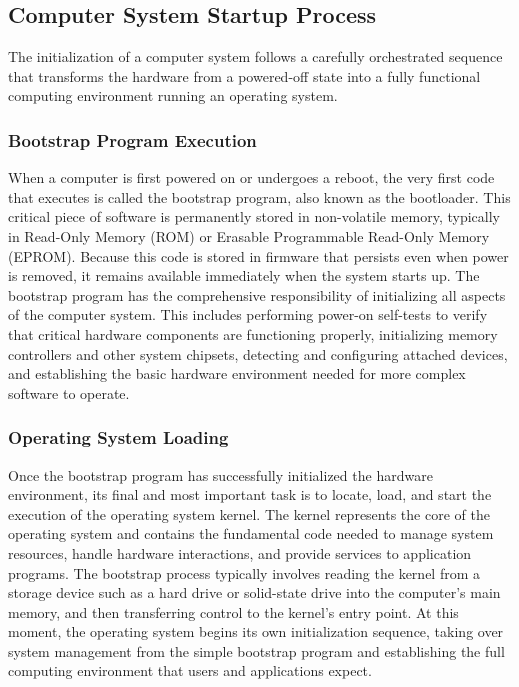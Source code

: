    \subsection{Computer System Startup Process}

    The initialization of a computer system follows a carefully orchestrated sequence that transforms the hardware from a powered-off state into a fully functional computing environment running an operating system.


    \subsubsection{Bootstrap Program Execution}

    When a computer is first powered on or undergoes a reboot, the very first code that executes is called the bootstrap program, also known as the bootloader. This critical piece of software is permanently stored in non-volatile memory, typically in Read-Only Memory (ROM) or Erasable Programmable Read-Only Memory (EPROM). Because this code is stored in firmware that persists even when power is removed, it remains available immediately when the system starts up.
    The bootstrap program has the comprehensive responsibility of initializing all aspects of the computer system. This includes performing power-on self-tests to verify that critical hardware components are functioning properly, initializing memory controllers and other system chipsets, detecting and configuring attached devices, and establishing the basic hardware environment needed for more complex software to operate.


    \subsubsection{Operating System Loading}

    Once the bootstrap program has successfully initialized the hardware environment, its final and most important task is to locate, load, and start the execution of the operating system kernel. The kernel represents the core of the operating system and contains the fundamental code needed to manage system resources, handle hardware interactions, and provide services to application programs.
    The bootstrap process typically involves reading the kernel from a storage device such as a hard drive or solid-state drive into the computer's main memory, and then transferring control to the kernel's entry point. At this moment, the operating system begins its own initialization sequence, taking over system management from the simple bootstrap program and establishing the full computing environment that users and applications expect.


